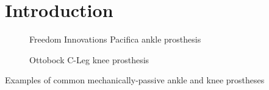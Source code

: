 \chapter{Introduction}
\begin{marginfigure}
    \centering
	\begin{subfigure}[b]{\textwidth}
    	\centering
        \caption{Freedom Innovations Pacifica ankle prosthesis}
        \label{fig:freedom_innov_pacifica}
        \vspace{0.25in}
	\end{subfigure}
	\begin{subfigure}[b]{\textwidth}
    	\centering
        \caption{Ottobock C-Leg knee prosthesis}
        \label{fig:ottobock_cleg}
	\end{subfigure}
    \caption{Examples of common mechanically-passive ankle and knee prostheses}
\end{marginfigure}

